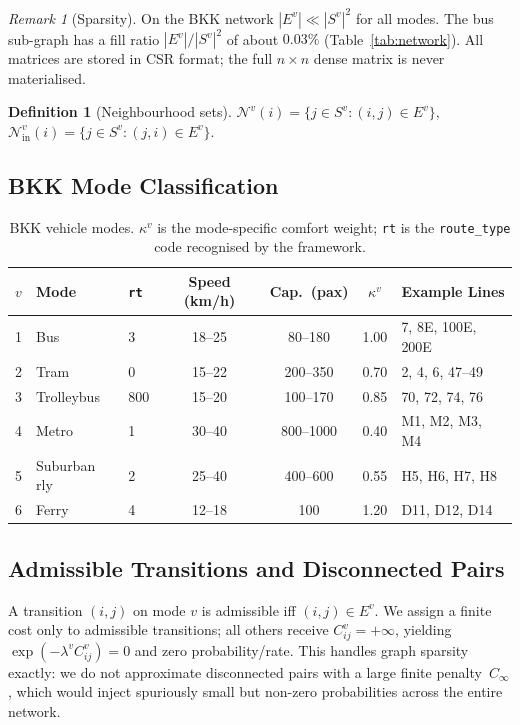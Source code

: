 \documentclass[12pt,a4paper]{article}
\theoremstyle{plain}
\theoremstyle{definition}
\newtheorem{definition}[theorem]{Definition}
\theoremstyle{remark}
\newtheorem{remark}[theorem]{Remark}
\begin{document}
\begin{remark}[Sparsity]
On the BKK network $|E^v|\ll|S^v|^2$ for all modes.  The bus sub-graph has
a fill ratio $|E^v|/|S^v|^2$ of about $0.03\%$ (Table~\ref{tab:network}).  All matrices are stored in CSR format; the full
$n\times n$ dense matrix is never materialised.
\end{remark}

\begin{definition}[Neighbourhood sets]
$\mathcal{N}^v(i)=\{j\in S^v:(i,j)\in E^v\}$,\quad
$\mathcal{N}^v_{\mathrm{in}}(i)=\{j\in S^v:(j,i)\in E^v\}$.
\end{definition}

\subsection{BKK Mode Classification}

\begin{table}[htbp]
\centering
\small
\begin{tabular}{cllcccl}
\toprule
$v$ & Mode & \texttt{rt} & Speed (km/h) & Cap.\ (pax) & $\kappa^v$ & Example Lines \\
\midrule
1 & Bus          & 3   & 18--25 & 80--180   & 1.00 & 7, 8E, 100E, 200E \\
2 & Tram         & 0   & 15--22 & 200--350  & 0.70 & 2, 4, 6, 47--49 \\
3 & Trolleybus   & 800 & 15--20 & 100--170  & 0.85 & 70, 72, 74, 76 \\
4 & Metro        & 1   & 30--40 & 800--1000 & 0.40 & M1, M2, M3, M4 \\
5 & Suburban rly & 2   & 25--40 & 400--600  & 0.55 & H5, H6, H7, H8 \\
6 & Ferry        & 4   & 12--18 & 100       & 1.20 & D11, D12, D14 \\
\bottomrule
\end{tabular}
\caption{BKK vehicle modes.  $\kappa^v$ is the mode-specific comfort weight;
  \texttt{rt} is the \texttt{route\_type} code recognised by the framework.}
\label{tab:modes}
\end{table}

\subsection{Admissible Transitions and Disconnected Pairs}

A transition $(i,j)$ on mode $v$ is admissible iff $(i,j)\in E^v$.  We assign
a finite cost only to admissible transitions; all others receive
$C^v_{ij}=+\infty$, yielding $\exp(-\lambda^v C^v_{ij})=0$ and zero
probability/rate.  This handles graph sparsity exactly: we do
not approximate disconnected pairs with a large finite penalty~$C_\infty$,
which would inject spuriously small but non-zero probabilities across the entire
network.
\end{document}
